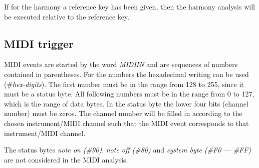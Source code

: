 \iffalse
Bei einer Harmonieform\index{Harmonieform} wird überprüft,
ob die Harmonie relativ zu jedem
Ton der Fundamentaltonleiter zutrifft. Wird eine solchermaßen
verschobene Harmonie erkannt, gilt der Auslöser als erfüllt
und der Wert \keyword{ABSTAND}\index{ABSTAND} wird entsprechend der
Harmonieanalyse gesetzt.
\fi

If for the harmony a reference key has been
given, then the harmony analysis will be executed relative to the
reference key.

\iffalse
Wenn bei der Harmonie eine Bezugstaste\index{Bezugstaste}
 angegeben wurde, dann wird
die Harmonie-Analyse relativ um die Bezugstaste verschoben
durchgeführt.
\fi



\subsection{MIDI trigger}\label{sec:midi-ereignisse}
MIDI events are started by the word \textit{MIDIIN} and
are sequences of numbers contained in parentheses. For the numbers the
hexadecimal writing can be used (\#\textit{hex-digits}).
The first number must be in the range from 128 to 255, since it must
be a status byte. All following numbers must be in the range from 0 to
127, which is the range of data bytes. In the status byte the lower
four bits (channel number) must be zeros. The channel number will be
filled in according to the chosen instrument/MIDI channel such that
the MIDI event corresponds to that instrument/MIDI channel.

The status bytes \textit{note on (\#90)},
\textit{note off (\#80)} and \textit{system byte (\#F0 --- \#FF)} are
not considered in the MIDI analysis.

\iffalse
MIDI-Ereignisse werden mit dem Wort {\it MIDIIN}\index{MIDIIN}
eingeleitet und
sind eine eingeklammerte Folge von Zahlen. Bei Zahlen ist die sedezimale
Schreibweise zulässig (\#{\it ziffern}).\index{*#@\#}
Die erste Zahl muss im Bereich von
128 bis 255 liegen, also ein Status-Byte sein. Alle weiteren Zahlen
müssen im Bereich von 0 bis 127 liegen, also Daten-Bytes sein.
Beim Status-Byte müssen die unteren vier Bits (Kanal-Nummer) auf Null stehen.
Die tatsächliche Kanalnummer wird dem jeweiligen
Instrument/MIDI-Kanal zugeordnet,
so daß ein MIDI-Ereignis sich jeweils auf das richtige
Instrument/MIDI-Kanal bezieht.
Die Status-Bytes\index{Status-Byte}
 {\it Note-On\index{Note-On} (\#90)}, {\it Note-Off\index{Note-Off}
  (\#80)} und
{\it System-Byte\index{System-Byte}
 (\#F0 - \#FF)} werden nicht in die MIDI-Analyse
einbezogen.
\fi

